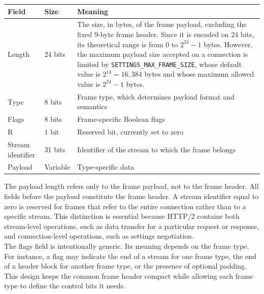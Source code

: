 \documentclass{scrbook}
\begin{document}
\begin{center}
	\begin{tabularx}{\linewidth}{llX}
		\hline
		
		\textbf{Field} & \textbf{Size} & \textbf{Meaning} \\
		\hline
		
		Length & 24 bits & The size, in bytes, of the frame payload, excluding the fixed 9-byte frame header. Since it is encoded on 24 bits, its theoretical range is from 0 to $2^{24}-1$ bytes. However, the maximum payload size accepted on a connection is limited by \texttt{SETTINGS\_MAX\_FRAME\_SIZE}, whose default value is $2^{14}=16{,}384$ bytes and whose maximum allowed value is $2^{24}-1$ bytes. \\ \hline
		
		Type & 8 bits & Frame type, which determines payload format and semantics \\ \hline
		
		Flags & 8 bits & Frame-specific Boolean flags \\ \hline
		
		R & 1 bit & Reserved bit, currently set to zero \\ \hline
		
		Stream identifier & 31 bits & Identifier of the stream to which the frame belongs \\ \hline
		
		Payload & Variable & Type-specific data \\ \hline
	\end{tabularx}
\end{center}

The payload length refers only to the frame payload, not to the frame header. All fields before the payload constitute the frame header. A stream identifier equal to zero is reserved for frames that refer to the entire connection rather than to a specific stream. This distinction is essential because HTTP/2 contains both stream-level operations, such as data transfer for a particular request or response, and connection-level operations, such as settings negotiation.\\

The flags field is intentionally generic. Its meaning depends on the frame type. For instance, a flag may indicate the end of a stream for one frame type, the end of a header block for another frame type, or the presence of optional padding. This design keeps the common frame header compact while allowing each frame type to define the control bits it needs.
\end{document}
